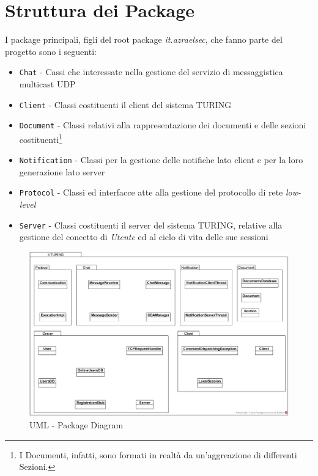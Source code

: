 \section{Struttura dei Package}
I package principali, figli del root package \textit{it.azraelsec}, che fanno parte del progetto sono i seguenti:
\begin{itemize}
	\item \texttt{Chat} - Cassi che interessate nella gestione del servizio di messaggistica multicast UDP
	\item \texttt{Client} - Classi costituenti il client del sistema TURING
	\item \texttt{Document} - Classi relativi alla rappresentazione dei documenti e delle sezioni costituenti\footnote{I Documenti, infatti, sono formati in realtà da un'aggreazione di differenti Sezioni.}
	\item \texttt{Notification} - Classi per la gestione delle notifiche lato client e per la loro generazione lato server
	\item \texttt{Protocol} - Classi ed interfacce atte alla gestione del protocollo di rete \textit{low-level}
	\item \texttt{Server} - Classi costituenti il server del sistema TURING, relative alla gestione del concetto di \textit{Utente} ed al ciclo di vita delle sue sessioni
\end{itemize}
\begin{figure}[h]
	\caption{UML - Package Diagram}
	\centering
	\includegraphics[width=1\linewidth]{assets/package_diagram}
\end{figure}

\pagebreak
